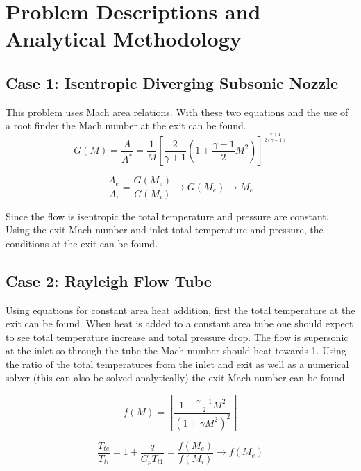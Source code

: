 \documentclass[conf]{new-aiaa}
\begin{document}
\section{Problem Descriptions and Analytical Methodology}



\subsection*{Case 1: Isentropic Diverging Subsonic Nozzle}

This problem uses Mach area relations. 
With these two equations and the use of a root finder the Mach number at the exit can be found. 
\begin{equation}
    G(M)= 
    \frac{A}{A^*}=
    \frac{1}{M} \left[\frac{2}{\gamma+1} \left(1+\frac{\gamma-1}{2} M^2 \right)\right]^{\frac{\gamma+1}{2(\gamma-1)}}
\end{equation}

\begin{equation}
    \frac{A_e}{A_i} = \frac{G(M_e)}{G(M_i)} \rightarrow G(M_e) \rightarrow M_e
\end{equation}

Since the flow is isentropic the total temperature and pressure are constant.
Using the exit Mach number and inlet total temperature and pressure, the conditions at the exit can be found.

\subsection*{Case 2: Rayleigh Flow Tube}

Using equations for constant area heat addition, first the total temperature at the exit can be found.
When heat is added to a constant area tube one should expect to see total temperature increase and total pressure drop.
The flow is supersonic at the inlet so through the tube the Mach number should heat towards 1.
Using the ratio of the total temperatures from the inlet and exit as well as a numerical solver (this can also be solved analytically) the exit Mach number can be found.

\begin{equation}
    f(M) = \left[
    \frac{1+\frac{\gamma-1}{2} M^2}{\left(1+\gamma M^2\right)^2}
    \right]
\end{equation}

\begin{equation}
    \frac{T_{te}}{T_{ti}} = 
    1 + \frac{q}{C_p T_{t1}} = 
    \frac{f(M_e)}{f(M_i)} \rightarrow f(M_e)
\end{equation}
\end{document}
